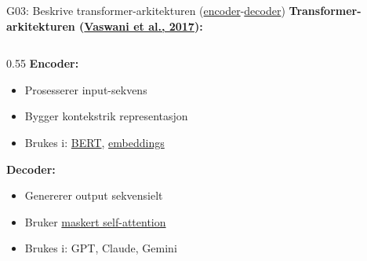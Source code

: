 \documentclass[aspectratio=169, 10pt]{beamer}
\begin{document}
\begin{frame}{G03: Beskrive transformer-arkitekturen (\href{https://en.wikipedia.org/wiki/Transformer_(deep_learning_architecture)\#Encoder}{encoder}-\href{https://en.wikipedia.org/wiki/Transformer_(deep_learning_architecture)\#Decoder}{decoder})}
    \textbf{Transformer-arkitekturen (\href{https://arxiv.org/abs/1706.03762}{Vaswani et al., 2017}):}

    \begin{columns}[T]
        \begin{column}{0.55\textwidth}
            \textbf{Encoder:}
            \begin{itemize}
                \item Prosesserer input-sekvens
                \item Bygger kontekstrik representasjon
                \item Brukes i: \href{https://arxiv.org/abs/1810.04805}{BERT}, \href{https://en.wikipedia.org/wiki/Word_embedding}{embeddings}
            \end{itemize}

            \vspace{0.2cm}
            \textbf{Decoder:}
            \begin{itemize}
                \item Genererer output sekvensielt
                \item Bruker \href{https://en.wikipedia.org/wiki/Attention_(machine_learning)\#Causal_attention}{maskert self-attention}
                \item Brukes i: GPT, Claude, Gemini
            \end{itemize}


\end{column}
\end{columns}
\end{frame}
\end{document}
